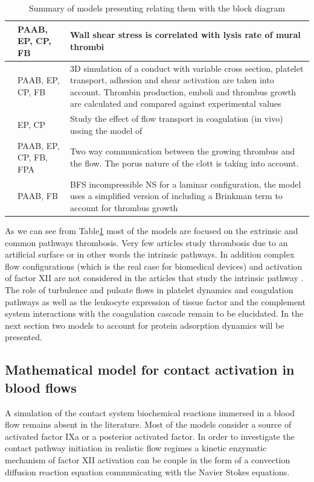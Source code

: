 \documentclass[%
 nofootinbib,
 amsmath,amssymb,
 aps,
 pra,
]{revtex4-1}
\begin{document}
\begin{table}[h]
\begin{tabular}{|p{5 cm} | p{3.5cm} | p{9.5 cm} |}
\hline
\citet{Wootton:2002} &  PAAB, EP, CP, FB & Wall shear stress is correlated with lysis rate of mural thrombi\\
\hline
\citet{Goodman:2005} & PAAB, EP, CP, FB & 3D simulation of a conduct with variable cross section, platelet transport, adhesion and shear activation are taken into account. Thrombin production, emboli and thrombus growth are calculated and compared against experimental values\\
\hline
\citet{Biasetti:2012} & EP, CP  & Study the effect of flow transport in coagulation (in vivo) ussing the model of \cite{Jones:1994}\\
\hline
\citet{Leiderman:2011} & PAAB, EP, CP, FB, FPA & Two way communication between the growing thrombus and the flow. The porus nature of the clott is taking into account.\\
\hline
\citet{Taylor:2015} & PAAB, FB & BFS incompressible NS for a laminar configuration, the model uses a simplified version of \citet{Fogelson:2004} including a Brinkman term to account for thrombus growth \\
\hline
\end{tabular}\caption{\label{tab:recap}Summary of models presenting relating them with the block diagram}
\end{table}

As we can see from Table\ref{tab:recap} most of the models are focused on the extrinsic and common pathways thrombosis. Very few articles study thrombosis due to an artificial surface or in other words the intrinsic pathways. In addition complex flow configurations (which is the real case for biomedical devices) and activation of factor XII are not considered in the articles that study the intrinsic pathway \citep{Gregory:1994,Zarnitsina:1996,Mandrusov:1998,Chatterjee:2010,Kogan:2001}.\\ The role of turbulence and pulsate flows in platelet dynamics and coagulation pathways as well as the leukocyte expression of tissue factor and the complement system interactions with the coagulation cascade remain to be elucidated. In the next section two models to account for protein adsorption dynamics will be presented.
\subsection{Mathematical model for contact activation in blood flows}
A simulation of the contact system biochemical reactions immersed in a blood flow remains absent in the literature. Most of the models consider a source of activated factor IXa or a posterior activated factor. In order to investigate the contact pathway initiation in realistic flow regimes a kinetic enzymatic mechanism of factor XII activation can be couple in the form of a convection diffusion reaction equation communicating with the Navier Stokes equations.\\
\end{document}
